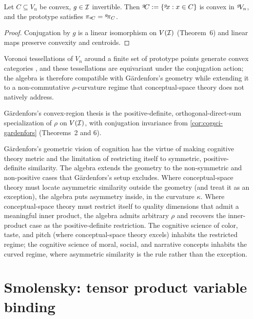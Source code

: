 \begin{corollary}\label{cor:cogsci-gardenfors}
Let $C\subseteq V_n$ be convex, $g\in\mathcal{I}$ invertible. Then
${}^{g}\!C\mathrel{:=}\{{}^{g}\!x:x\in C\}$ is convex in
${}^{g}\!V_n$, and the prototype satisfies
$\pi_{{}^{g}\!C}={}^{g}\!\pi_C$.
\end{corollary}

\begin{proof}
Conjugation by $g$ is a linear isomorphism on $V(\mathcal{I})$ (Theorem~6) and
linear maps preserve convexity and centroids. \qedhere
\end{proof}

Voronoi tessellations of $V_n$ around a finite set of prototype points
generate convex categories \citep{Gardenfors2000}, and these tessellations
are equivariant under the conjugation action; the algebra is therefore
compatible with G\"ardenfors's geometry while extending it to a
non-commutative $\rho$-curvature regime that conceptual-space theory does
not natively address.

\formalstatus G\"ardenfors's convex-region thesis is the
positive-definite, orthogonal-direct-sum specialization of $\rho$ on
$V(\mathcal{I})$, with conjugation invariance from \cref{cor:cogsci-gardenfors}
(Theorems~2 and 6).

\litcomment G\"ardenfors's geometric vision of cognition has the virtue
of making cognitive theory metric and the limitation of restricting
itself to symmetric, positive-definite similarity. The algebra extends
the geometry to the non-symmetric and non-positive cases that
G\"ardenfors's setup excludes. Where conceptual-space theory must locate
asymmetric similarity outside the geometry (and treat it as an
exception), the algebra puts asymmetry inside, in the curvature
$\kappa$. Where conceptual-space theory must restrict itself to
quality dimensions that admit a meaningful inner product, the algebra
admits arbitrary $\rho$ and recovers the inner-product case as the
positive-definite restriction. The cognitive science of color, taste,
and pitch (where conceptual-space theory excels) inhabits the
restricted regime; the cognitive science of moral, social, and
narrative concepts inhabits the curved regime, where asymmetric
similarity is the rule rather than the exception.

\section{Smolensky: tensor product variable binding}\label{sec:cogsci-smolensky}

